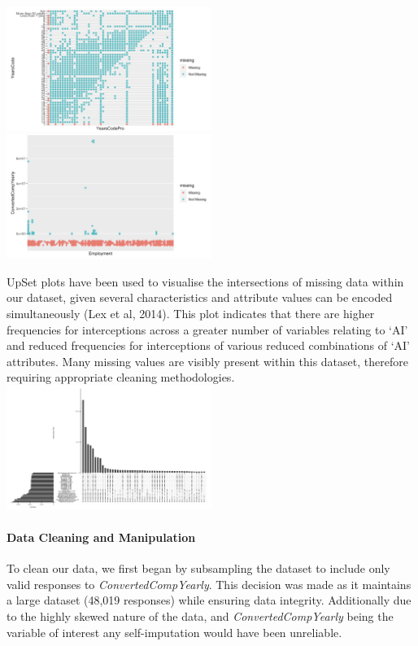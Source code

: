 \documentclass[
  12pt,
]{article}
\begin{document}
\includegraphics[width=0.5\textwidth,height=0.5\textheight]{MV_YearsCode_vs_Pro.png}
\includegraphics[width=0.5\textwidth,height=0.5\textheight]{MV_Employment_vs_converted_comp.png}

UpSet plots have been used to visualise the intersections of missing
data within our dataset, given several characteristics and attribute
values can be encoded simultaneously (Lex et al, 2014). This plot
indicates that there are higher frequencies for interceptions across a
greater number of variables relating to `AI' and reduced frequencies for
interceptions of various reduced combinations of `AI' attributes. Many
missing values are visibly present within this dataset, therefore
requiring appropriate cleaning methodologies.
\includegraphics[width=0.5\textwidth,height=0.5\textheight]{Missing_values_upset.png}

\hypertarget{data-cleaning-and-manipulation}{%
\paragraph{Data Cleaning and
Manipulation}\label{data-cleaning-and-manipulation}}

To clean our data, we first began by subsampling the dataset to include
only valid responses to \emph{ConvertedCompYearly}. This decision was
made as it maintains a large dataset (48,019 responses) while ensuring
data integrity. Additionally due to the highly skewed nature of the
data, and \emph{ConvertedCompYearly} being the variable of interest any
self-imputation would have been unreliable.
\end{document}
